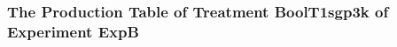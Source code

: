  \begin{frame}
 \fontsize{8pt}{9pt}\selectfont
 \frametitle{ The Production Table of Treatment BoolT1sgp3k of Experiment ExpB }

 \label{ExpBGrammarTable006.tex}  
 \end{frame}

